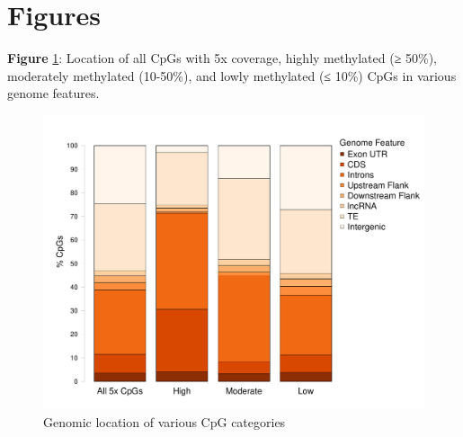 \documentclass [11pt, proquest] {uwthesis}[2015/03/03]
\begin{document}
\clearpage

\hypertarget{figures-2}{%
\section{Figures}\label{figures-2}}

\textbf{Figure} \ref{fig:fembackground}: Location of all CpGs with 5x coverage, highly methylated (≥ 50\%), moderately methylated (10-50\%), and lowly methylated (≤ 10\%) CpGs in various genome features.\newline 
\begin{figure}[h]
\centering
  \includegraphics[width=1\textwidth]{figure/Ch3/Figure3.1.pdf}
  \caption{Genomic location of various CpG categories}
  \label{fig:fembackground}
\end{figure}
\clearpage
\end{document}
